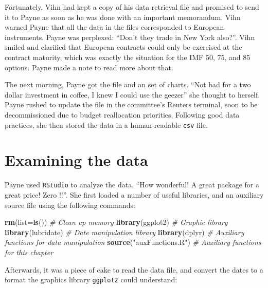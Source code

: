 \documentclass[]{book}
\newenvironment{Shaded}{\begin{snugshade}}{\end{snugshade}}
\newcommand{\KeywordTok}[1]{\textcolor[rgb]{0.13,0.29,0.53}{\textbf{#1}}}
\newcommand{\DataTypeTok}[1]{\textcolor[rgb]{0.13,0.29,0.53}{#1}}
\newcommand{\StringTok}[1]{\textcolor[rgb]{0.31,0.60,0.02}{#1}}
\newcommand{\CommentTok}[1]{\textcolor[rgb]{0.56,0.35,0.01}{\textit{#1}}}
\newcommand{\OtherTok}[1]{\textcolor[rgb]{0.56,0.35,0.01}{#1}}
\newcommand{\OperatorTok}[1]{\textcolor[rgb]{0.81,0.36,0.00}{\textbf{#1}}}
\newcommand{\NormalTok}[1]{#1}
\theoremstyle{definition}
\theoremstyle{definition}
\theoremstyle{definition}
\theoremstyle{remark}
\begin{document}
Fortunately, Vihn had kept a copy of his data retrieval file and
promised to send it to Payne as soon as he was done with an important
memorandum. Vihn warned Payne that all the data in the files
corresponded to European instruments. Payne was perplexed: ``Don't they
trade in New York also?''. Vihn smiled and clarified that European
contracts could only be exercised at the contract maturity, which was
exactly the situation for the IMF 50, 75, and 85 options. Payne made a
note to read more about that.

The next morning, Payne got the file and an set of charts. ``Not bad for
a two dollar investment in coffee, I knew I could use the geezer'' she
thought to herself. Payne rushed to update the file in the committee's
Reuters terminal, soon to be decommissioned due to budget reallocation
priorities. Following good data practices, she then stored the data in a
human-readable \texttt{csv} file.

\section{Examining the data}\label{Data_exploration}

Payne used \texttt{RStudio} to analyze the data. ``How wonderful! A
great package for a great price! Zero !!''. She first loaded a number of
useful libraries, and an auxiliary source file using the following
commands:

\begin{Shaded}
\begin{Highlighting}[]
\KeywordTok{rm}\NormalTok{(}\DataTypeTok{list=}\KeywordTok{ls}\NormalTok{())             }\CommentTok{# Clean up memory}
\KeywordTok{library}\NormalTok{(ggplot2)          }\CommentTok{# Graphic library}
\KeywordTok{library}\NormalTok{(lubridate)        }\CommentTok{# Date manipulation library}
\KeywordTok{library}\NormalTok{(dplyr)            }\CommentTok{# Auxiliary functions for data manipulation}
\KeywordTok{source}\NormalTok{(}\StringTok{"auxFunctions.R"}\NormalTok{)  }\CommentTok{# Auxiliary functions for this chapter}
\end{Highlighting}
\end{Shaded}

Afterwards, it was a piece of cake to read the data file, and convert
the dates to a format the graphics library \texttt{ggplot2} could
understand:

\begin{Shaded}
\end{Shaded}
\end{document}
